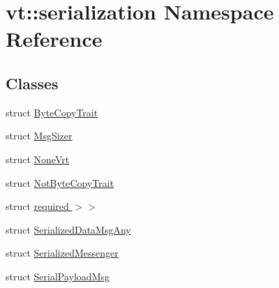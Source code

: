 \hypertarget{namespacevt_1_1serialization}{}\section{vt\+:\+:serialization Namespace Reference}
\label{namespacevt_1_1serialization}
\subsection*{Classes}
\begin{DoxyCompactItemize}
\item 
struct \hyperlink{structvt_1_1serialization_1_1_byte_copy_trait}{Byte\+Copy\+Trait}
\item 
struct \hyperlink{structvt_1_1serialization_1_1_msg_sizer}{Msg\+Sizer}
\item 
struct \hyperlink{structvt_1_1serialization_1_1_none_vrt}{None\+Vrt}
\item 
struct \hyperlink{structvt_1_1serialization_1_1_not_byte_copy_trait}{Not\+Byte\+Copy\+Trait}
\item 
struct \hyperlink{structvt_1_1serialization_1_1_msg_sizer_3_01_msg_t_00_01typename_01std_1_1enable__if__t_3_01truef7c1c60bd8be3734bca21f11ad0334d1}{required $>$$>$}
\item 
struct \hyperlink{structvt_1_1serialization_1_1_serialized_data_msg_any}{Serialized\+Data\+Msg\+Any}
\item 
struct \hyperlink{structvt_1_1serialization_1_1_serialized_messenger}{Serialized\+Messenger}
\item 
struct \hyperlink{structvt_1_1serialization_1_1_serial_payload_msg}{Serial\+Payload\+Msg}
\end{DoxyCompactItemize}
